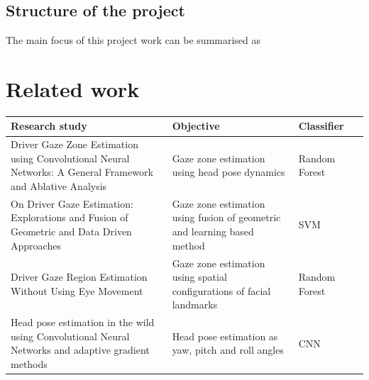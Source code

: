 \documentclass[a4paper, 12pt, oneside, BCOR1cm,toc=chapterentrywithdots]{scrbook}
\begin{document}
\section{Structure of the project}
The main focus of this project work can be summarised as





\chapter{Related work}
\begin{center}
\begin{tabular}{| p{5cm}| p{5cm}  | l | l |}
\hline
Research study & Objective & Classifier\\
\hline
Driver Gaze Zone Estimation using Convolutional Neural Networks:
A General Framework and Ablative Analysis \cite{} & Gaze zone estimation
using head pose dynamics & Random Forest\\
\hline
On Driver Gaze Estimation: Explorations and Fusion of Geometric and
Data Driven Approaches \cite{} & Gaze zone estimation using fusion of geometric and learning based  method & SVM\\ 
\hline
Driver Gaze Region Estimation Without Using Eye Movement \cite{} & Gaze zone estimation
using spatial configurations of facial landmarks & Random Forest\\
\hline
Head pose estimation in the wild using Convolutional Neural Networks and adaptive gradient methods \cite{} & Head pose estimation as yaw, pitch and roll angles & CNN\\
\hline
\end{tabular}
\label{tab:table1}
\end{center}
\end{document}
